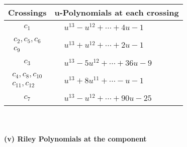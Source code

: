 \documentclass[1p]{elsarticle_modified}
\theoremstyle{definition}
\begin{document}
\begin{tabular}{m{50pt}|m{274pt}}
Crossings & \hspace{64pt}u-Polynomials at each crossing \\
\hline $$\begin{aligned}c_{1}\end{aligned}$$&$\begin{aligned}
&u^{13}- u^{12}+\cdots+4 u-1
\end{aligned}$\\
\hline $$\begin{aligned}c_{2},c_{5},c_{6}\\c_{9}\end{aligned}$$&$\begin{aligned}
&u^{13}+u^{12}+\cdots+2 u-1
\end{aligned}$\\
\hline $$\begin{aligned}c_{3}\end{aligned}$$&$\begin{aligned}
&u^{13}-5 u^{12}+\cdots+36 u-9
\end{aligned}$\\
\hline $$\begin{aligned}c_{4},c_{8},c_{10}\\c_{11},c_{12}\end{aligned}$$&$\begin{aligned}
&u^{13}+8 u^{11}+\cdots- u-1
\end{aligned}$\\
\hline $$\begin{aligned}c_{7}\end{aligned}$$&$\begin{aligned}
&u^{13}- u^{12}+\cdots+90 u-25
\end{aligned}$\\
\hline
\end{tabular}\\~\\
\newpage\renewcommand{\arraystretch}{1}
\flushleft \textbf{(v) Riley Polynomials at the component}\newline \\
\end{document}
